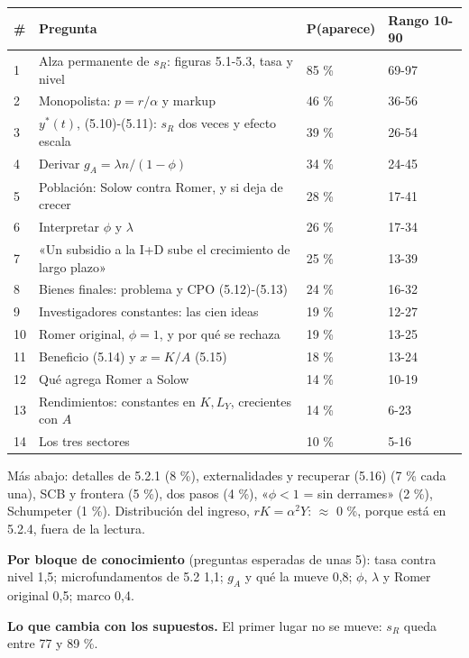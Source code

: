 \documentclass[11pt,a4paper]{article}
\begin{document}
\begin{center}\small\begin{tabular}{p{0.6cm}p{9.4cm}p{1.8cm}p{1.9cm}}\toprule
\# & Pregunta & P(aparece) & Rango 10-90 \\\midrule
1 & Alza permanente de $s_R$: figuras 5.1-5.3, tasa y nivel & 85 \% & 69-97 \\
2 & Monopolista: $p = r/\alpha$ y markup & 46 \% & 36-56 \\
3 & $y^*(t)$, (5.10)-(5.11): $s_R$ dos veces y efecto escala & 39 \% & 26-54 \\
4 & Derivar $g_A = \lambda n/(1-\phi)$ & 34 \% & 24-45 \\
5 & Población: Solow contra Romer, y si deja de crecer & 28 \% & 17-41 \\
6 & Interpretar $\phi$ y $\lambda$ & 26 \% & 17-34 \\
7 & «Un subsidio a la I+D sube el crecimiento de largo plazo» & 25 \% & 13-39 \\
8 & Bienes finales: problema y CPO (5.12)-(5.13) & 24 \% & 16-32 \\
9 & Investigadores constantes: las cien ideas & 19 \% & 12-27 \\
10 & Romer original, $\phi = 1$, y por qué se rechaza & 19 \% & 13-25 \\
11 & Beneficio (5.14) y $x = K/A$ (5.15) & 18 \% & 13-24 \\
12 & Qué agrega Romer a Solow & 14 \% & 10-19 \\
13 & Rendimientos: constantes en $K, L_Y$, crecientes con $A$ & 14 \% & 6-23 \\
14 & Los tres sectores & 10 \% & 5-16 \\
\bottomrule\end{tabular}\end{center}

Más abajo: detalles de 5.2.1 (8 \%), externalidades y recuperar (5.16) (7 \% cada una), SCB y frontera (5 \%), dos pasos (4 \%), «$\phi<1$ = sin derrames» (2 \%), Schumpeter (1 \%). Distribución del ingreso, $rK = \alpha^2 Y$: $\approx$ 0 \%, porque está en 5.2.4, fuera de la lectura.

\textbf{Por bloque de conocimiento} (preguntas esperadas de unas 5): tasa contra nivel 1,5; microfundamentos de 5.2 1,1; $g_A$ y qué la mueve 0,8; $\phi$, $\lambda$ y Romer original 0,5; marco 0,4.

\textbf{Lo que cambia con los supuestos.} El primer lugar no se mueve: $s_R$ queda entre 77 y 89 \%.
\end{document}
